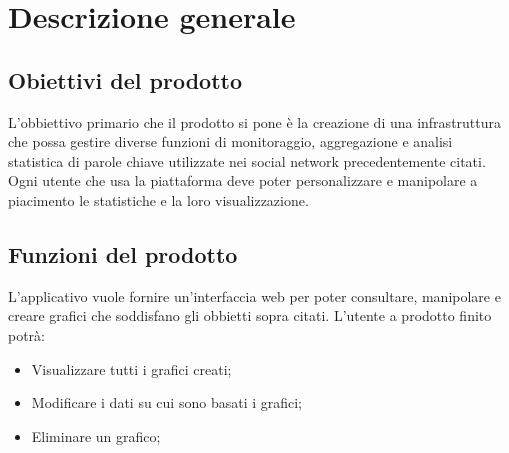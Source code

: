 %


\section{Descrizione generale}

\subsection{Obiettivi del prodotto}
L'obbiettivo primario che il prodotto si pone è la creazione di una infrastruttura che
possa gestire diverse funzioni di monitoraggio, aggregazione e analisi statistica di parole chiave utilizzate nei social network precedentemente citati. Ogni utente che usa la piattaforma deve poter personalizzare e manipolare a piacimento le statistiche e la loro visualizzazione.

\subsection{Funzioni del prodotto}
L'applicativo vuole fornire un'interfaccia web per poter consultare, manipolare e creare grafici che soddisfano gli obbietti sopra citati. L'utente a prodotto finito potrà:

\begin{itemize}
\item Visualizzare tutti i grafici creati;
\item Modificare i dati su cui sono basati i grafici;
\item Eliminare un grafico;
\end{itemize}

